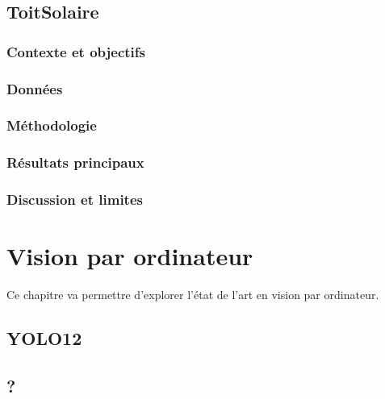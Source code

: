 {{{%
\subsection{ToitSolaire}

\subsubsection{Contexte et objectifs}

\subsubsection{Données}

\subsubsection{Méthodologie}

\subsubsection{Résultats principaux}

\subsubsection{Discussion et limites}
\section{Vision par ordinateur}

\par{Ce chapitre va permettre d'explorer l'état de l'art en vision par ordinateur.}

\subsection{YOLO12}

\subsection{?}



}}}
